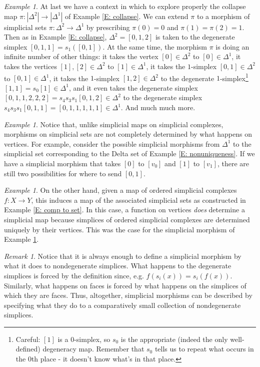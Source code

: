 \documentclass[12pt]{article}
\theoremstyle{plain}
\theoremstyle{definition}
\theoremstyle{remark}
\newtheorem{remark}[theorem]{Remark}
\newtheorem{example}[theorem]{Example}
\begin{document}
\begin{example}\label{E: simp mor v}
At last we have a context in which to explore properly the collapse map $\pi\colon|\Delta^2|\to |\Delta^1|$ of Example \ref{E: collapse}. We can extend $\pi$  to a morphism of simplicial sets $\pi\colon\Delta^2\to\Delta^1$ by prescribing $\pi(0)=0$ and $\pi(1)=\pi(2)=1$. Then as in Example \ref{E: collapse},  $\Delta^2=[0,1,2]$ is taken to the degenerate simplex $[0,1,1]=s_1([0,1])$. At the same time, the morphism $\pi$ is doing an infinite number of other things: it takes the vertex $[0]\in \Delta^2$ to $[0]\in \Delta^1$, it takes the vertices $[1],[2]\in \Delta^2$ to $[1]\in \Delta^1$, it takes the $1$-simplex $[0,1]\in \Delta^2$ to $[0,1]\in \Delta^1$, it takes the $1$-simplex $[1,2]\in \Delta^2$ to the degenerate $1$-simplex\footnote{Careful: $[1]$ is a $0$-simplex, so $s_0$ is the appropriate (indeed the only well-defined) degeneracy map. Remember that $s_0$ tells us to repeat what occurs in the $0$th place - it doesn't know what's in that place.} $[1,1]=s_0[1]\in \Delta^1$, and it even takes the degenerate simplex $[0,1,1,2,2,2]=s_4s_3s_1[0,1,2]\in \Delta^2$ to the degenerate simplex 
$s_4s_3s_1[0,1,1]=[0,1,1,1,1,1]\in \Delta^1$. And much much more. 
\end{example}

\begin{example}Notice that, unlike simplicial maps on simplicial complexes,  morphisms on simplicial sets are not completely determined by what happens on vertices. For example, consider the possible simplicial morphisms from $\Delta^1$ to the simplicial set corresponding to the Delta set of Example \ref{E: nonuniqueness}. If we have a simplicial morphism that takes $[0]$ to $[v_0]$ and $[1]$ to $[v_1]$, there are still two possibilities for where to send $[0,1]$. 
\end{example}


\begin{example}
On the other hand, given a map of ordered simplicial complexes $f\colon X\to Y$, this induces a map of the associated simplicial sets as constructed in Example \ref{E: comp to set}. In this case, a function on vertices \emph{does} determine a simplicial map because simplices of ordered simplicial complexes are determined uniquely by their vertices. 
This was the case for the simplicial morphism of Example \ref{E: simp mor v}.
\end{example}



\begin{remark}\label{R: map faces}
Notice that it is always enough to define a simplicial morphism by what it does to nondegenerate simplices. What happens to the degenerate simplices is forced by the definition since, e.g. $f(s_i(x))=s_i(f(x))$. Similarly, what happens on faces is forced by what happens on the simplices of which they are faces. Thus, altogether,  simplicial morphisms can be described  by specifying  what they do to a comparatively small collection of nondegenerate simplices.
\end{remark}
\end{document}
